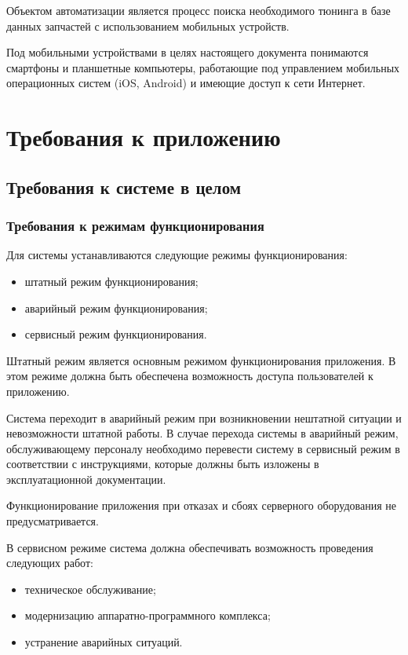 \documentclass[14pt]{extreport}
\begin{document}
Объектом автоматизации является процесс поиска необходимого тюнинга в базе данных запчастей с использованием мобильных устройств.

Под мобильными устройствами в целях настоящего документа понимаются смартфоны и планшетные компьютеры, работающие под управлением мобильных операционных систем (iOS, Android) и имеющие доступ к сети Интернет.

\chapter{Требования к приложению}
\section{Требования к системе в целом}
\subsection{Требования к режимам функционирования}
Для системы устанавливаются следующие режимы функционирования:
\begin{itemize}
	\item штатный режим функционирования;
	\item аварийный режим функционирования;
	\item сервисный режим функционирования.
\end{itemize}

Штатный режим является основным режимом функционирования приложения. В этом режиме должна быть обеспечена возможность доступа пользователей 
к приложению.

Система переходит в аварийный режим при возникновении нештатной ситуации и невозможности штатной работы. В случае перехода системы в аварийный режим, обслуживающему персоналу необходимо перевести систему в сервисный режим 
в соответствии с инструкциями, которые должны быть изложены в эксплуатационной документации.

Функционирование приложения при отказах и сбоях серверного оборудования не предусматривается.

В сервисном режиме система должна обеспечивать возможность проведения следующих работ:
\begin{itemize}
	\item техническое обслуживание;
	\item модернизацию аппаратно-программного комплекса;
	\item устранение аварийных ситуаций.
\end{itemize}
\end{document}
